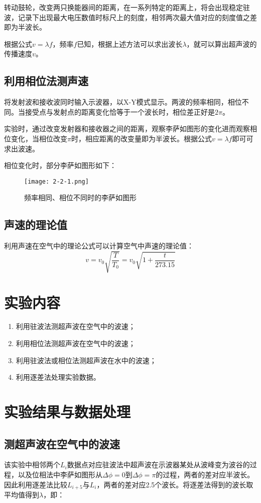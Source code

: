 \documentclass[12pt]{article}
\begin{document}
转动鼓轮，改变两只换能器间的距离，在一系列特定的距离上，将会出现稳定驻波，记录下出现最大电压数值时标尺上的刻度，相邻两次最大值对应的刻度值之差即为半波长。

根据公式$v=\lambda f$，频率$f$已知，根据上述方法可以求出波长$\lambda$，就可以算出超声波的传播速度$v$。

\subsection{利用相位法测声速}
将发射波和接收波同时输入示波器，以X-Y模式显示。两波的频率相同，相位不同。当接受点与发射点的距离变化恰等于一个波长时，相位差正好是$2\pi$。
	
实验时，通过改变发射器和接收器之间的距离，观察李萨如图形的变化进而观察相位变化，当相位改变$ \pi $时，相应距离的改变量即为半波长。根据公式$ v=\lambda f $即可可求出波速。

相位变化时，部分李萨如图形如下：

\begin{figure}[htbp]
    \centering
    \texttt{[image: 2-2-1.png]}
    \caption{频率相同、相位不同时的李萨如图形}
\end{figure}

\subsection{声速的理论值}
利用声速在空气中的理论公式可以计算空气中声速的理论值：
\begin{equation}\label{eq:6}
    v=v_0\sqrt{\frac{T}{T_0}}=v_0\sqrt{1+\frac{t}{273.15}}
\end{equation}

\section{实验内容}
\begin{enumerate}
    \item 利用驻波法测超声波在空气中的波速；
    \item 利用相位法测超声波在空气中的波速；
    \item 利用驻波法或相位法测超声波在水中的波速；
    \item 利用逐差法处理实验数据。
\end{enumerate}

\section{实验结果与数据处理}
\subsection{测超声波在空气中的波速}
该实验中相邻两个$L_i$数据点对应驻波法中超声波在示波器某处从波峰变为波谷的过程，以及位相法中李萨如图形从$\Delta\phi=0$到$\Delta\phi=\pi$的过程，两者的差对应半波长。因此利用逐差法比较$L_{i+5}$与$L_i$，两者的差对应2.5个波长。将逐差法得到的波长取平均值得到$\lambda$，即：
\end{document}
